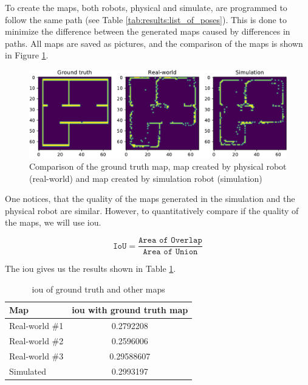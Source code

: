 To create the maps, both robots, physical and simulate, are programmed to follow the same path (see Table \ref{tab:results:list_of_poses}).
This is done to minimize the difference between the generated maps caused by differences in paths.
All maps are saved as pictures, and the comparison of the maps is shown in Figure \ref{fig:results:map_comparison}.

\begin{figure}[H]
    \centering
    \includegraphics[width=\textwidth]{./results/figures/map_comparison.pdf}
    \caption{Comparison of the ground truth map, map created by physical robot (real-world) and map created by simulation robot (simulation)}
    \label{fig:results:map_comparison}
\end{figure}

One notices, that the quality of the maps generated in the simulation and the physical robot are similar.
However, to quantitatively compare if the quality of the maps, we will use \ac{iou}.

\begin{equation}
    \texttt{IoU} = \frac{\texttt{Area of Overlap}}{\texttt{Area of Union}}
\end{equation}

The \ac{iou} gives us the results shown in Table \ref{tab:results:map_iou}.

\begin{table}[H]
    \centering
    \begin{tabular}{|l|c|}
        \hline
        \textbf{Map} & \textbf{\acs{iou} with ground truth map} \\
        \hline
        Real-world \#1 & 0.2792208 \\
        \hline
        Real-world \#2 & 0.2596006 \\
        \hline
        Real-world \#3 & 0.29588607 \\
        \hline
        Simulated & 0.2993197 \\
        \hline
    \end{tabular}
    \caption{\ac{iou} of ground truth and other maps}
    \label{tab:results:map_iou}
\end{table}


